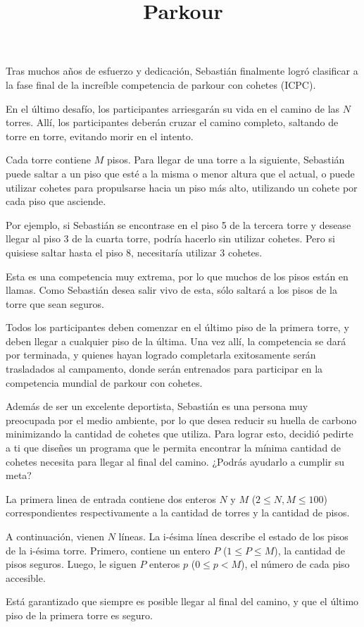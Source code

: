 \documentclass{oci}
\title{Parkour}
\begin{document}
\begin{problemDescription}
  Tras muchos años de esfuerzo y dedicación, Sebastián finalmente logró clasificar a la fase final de la increíble competencia de parkour con cohetes (ICPC).

  En el último desafío, los participantes arriesgarán su vida en el camino de las $N$ torres. Allí, los participantes deberán cruzar el camino completo, saltando de torre en torre, evitando morir en el intento.

  Cada torre contiene $M$ pisos. Para llegar de una torre a la siguiente, Sebastián puede saltar a un piso que esté a la misma o menor altura que el actual, o puede utilizar cohetes para propulsarse hacia un piso más alto, utilizando un cohete por cada piso que asciende.

  Por ejemplo, si Sebastián se encontrase en el piso 5 de la tercera torre y desease llegar al piso 3 de la cuarta torre, podría hacerlo sin utilizar cohetes. Pero si quisiese saltar hasta el piso 8, necesitaría utilizar 3 cohetes.

  Esta es una competencia muy extrema, por lo que muchos de los pisos están en llamas. Como Sebastián desea salir vivo de esta, sólo saltará a los pisos de la torre que sean seguros.

  Todos los participantes deben comenzar en el último piso de la primera torre, y deben llegar a cualquier piso de la última. Una vez allí, la competencia se dará por terminada, y quienes hayan logrado completarla exitosamente serán trasladados al campamento, donde serán entrenados para participar en la competencia mundial de parkour con cohetes.

  Además de ser un excelente deportista, Sebastián es una persona muy preocupada por el medio ambiente, por lo que desea reducir su huella de carbono minimizando la cantidad de cohetes que utiliza. Para lograr esto, decidió pedirte a ti que diseñes un programa que le permita encontrar la mínima cantidad de cohetes necesita para llegar al final del camino. ¿Podrás ayudarlo a cumplir su meta?

\end{problemDescription}

\begin{inputDescription}
  La primera linea de entrada contiene dos enteros $N$ y $M$ ($2 \leq N, M \leq 100$) correspondientes respectivamente a la cantidad de torres y la cantidad de pisos.

  A continuación, vienen $N$ líneas. La i-ésima línea describe el estado de los pisos de la i-ésima torre. Primero, contiene un entero $P$ ($1 \leq P \leq M$), la cantidad de pisos seguros. Luego, le siguen $P$ enteros $p$ ($0 \leq p < M$), el número de cada piso accesible.

  Está garantizado que siempre es posible llegar al final del camino, y que el último piso de la primera torre es seguro.
\end{inputDescription}
\end{document}
